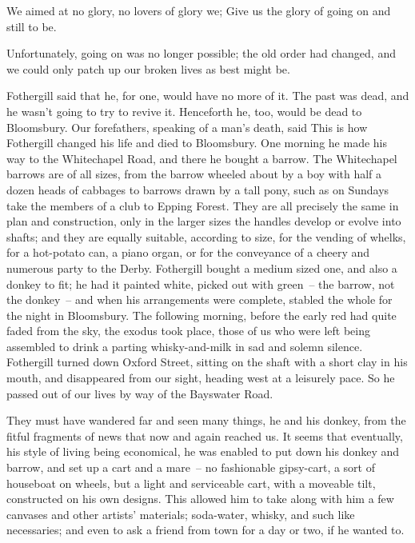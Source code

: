 \startnarrower
\startlines
We aimed at no glory, no lovers of glory we;
Give us the glory of going on and still to be.
\stoplines
\stopnarrower

Unfortunately, going on was no longer possible; the old order had
changed, and we could only patch up our broken lives as best might be.

Fothergill said that he, for one, would have no more of it. The past
was dead, and he wasn't going to try to revive it. Henceforth he,
too, would be dead to Bloomsbury. Our forefathers, speaking of a man's
death, said  This is how Fothergill
changed his life and died to Bloomsbury. One morning he made his way
to the Whitechapel Road, and there he bought a barrow. The
Whitechapel barrows are of all sizes, from the barrow wheeled about by
a boy with half a dozen heads of cabbages to barrows drawn by a tall
pony, such as on Sundays take the members of a club to Epping
Forest. They are all precisely the same in plan and construction, only
in the larger sizes the handles develop or evolve into shafts; and
they are equally suitable, according to size, for the vending of
whelks, for a hot-potato can, a piano organ, or for the conveyance of
a cheery and numerous party to the Derby. Fothergill bought a medium
sized  one, and also a donkey to fit; he had it
painted white, picked out with green~-- the barrow, not the
donkey~-- and when his arrangements were complete, stabled the whole
for the night in Bloomsbury. The following morning, before the early
red had quite faded from the sky, the exodus took place, those of us
who were left being assembled to drink a parting whisky-and-milk in
sad and solemn silence. Fothergill turned down Oxford Street, sitting
on the shaft with a short clay in his mouth, and disappeared from our
sight, heading west at a leisurely pace. So he passed out of our lives
by way of the Bayswater Road.

They must have wandered far and seen many things, he and his donkey,
from the fitful fragments of news that now and again reached us. It
seems that eventually, his style of living being economical, he was
enabled to put down his donkey and barrow, and set up a cart and a
mare~-- no fashionable gipsy-cart, a sort of houseboat on wheels, but a
light and serviceable cart, with a moveable tilt, constructed on his
own designs. This allowed him to take along with him a few canvases
and other artists' materials; soda-water, whisky, and such like
necessaries; and even to ask a friend from town for a day or two, if
he wanted to.


